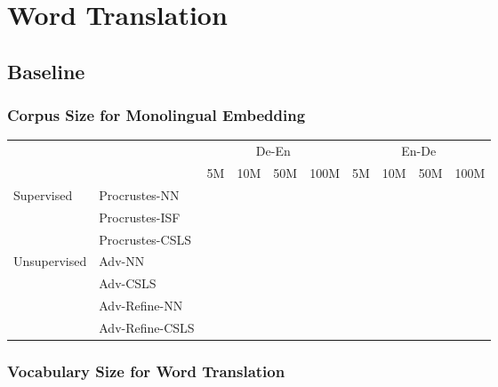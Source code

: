 \section{Word Translation}
\subsection{Baseline}
\subsubsection{Corpus Size for Monolingual Embedding}
\begin{table}[H]
	\begin{tabular}{llcccccccc}
		\hline
		\multicolumn{2}{c}{\multirow{2}{*}{}}          & \multicolumn{4}{c}{De-En} & \multicolumn{4}{c}{En-De} \\ \cline{3-10} 
		\multicolumn{2}{c}{}                           & 5M        & 10M        & 50M        & 100M       & 5M        & 10M        & 50M        & 100M       \\ \hline
		\multirow{3}{*}{Supervised}   & Procrustes-NN   &           &            &            &            &           &            &            &            \\ \cline{2-10} 
		& Procrustes-ISF  &           &            &            &            &           &            &            &            \\ \cline{2-10} 
		& Procrustes-CSLS &           &            &            &            &           &            &            &            \\ \hline
		\multirow{4}{*}{Unsupervised} & Adv-NN          &           &            &            &            &           &            &            &            \\ \cline{2-10} 
		& Adv-CSLS        &           &            &            &            &           &            &            &            \\ \cline{2-10} 
		& Adv-Refine-NN   &           &            &            &            &           &            &            &            \\ \cline{2-10} 
		& Adv-Refine-CSLS &           &            &            &            &           &            &            &            \\ \hline
	\end{tabular}
\end{table}

\subsubsection{Vocabulary Size for Word Translation}

